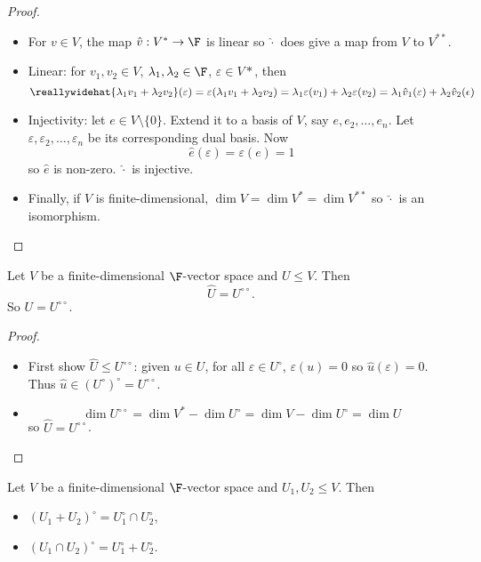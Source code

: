\documentclass[a4paper]{article}
\newcommand*{\ann}{\circ}
\theoremstyle{definition}
\begin{document}
\begin{proof}\leavevmode
  \begin{itemize}
  \item For \(v\in V\), the map \(\hat v: V^* \to \F\) is linear so \(\hat \cdot\) does give a map from \(V\) to \(V^{**}\).
  \item Linear: for \(v_1, v_2 \in V\), \(\lambda_1, \lambda_2 \in \F\), \(\varepsilon \in V*\), then
    \[
      \reallywidehat{\lambda_1v_1 + \lambda_2v_2}(\varepsilon) = \varepsilon(\lambda_1v_1 + \lambda_2v_2) = \lambda_1 \varepsilon(v_1) + \lambda_2 \varepsilon(v_2) = \lambda_1 \hat v_1(\varepsilon) + \lambda_2 \hat v_2(\epsilon)
    \]
  \item Injectivity: let \(e \in V\setminus\{0\}\). Extend it to a basis of \(V\), say \(e, e_2,\dots, e_n\). Let \(\varepsilon, \varepsilon_2,\dots, \varepsilon_n\) be its corresponding dual basis. Now
    \[
      \hat e(\varepsilon) = \varepsilon(e) = 1 
    \]
    so \(\hat e\) is non-zero. \(\hat \cdot\) is injective.
  \item Finally, if \(V\) is finite-dimensional, \(\dim V = \dim V^* = \dim V^{**}\) so \(\hat \cdot\) is an isomorphism.
  \end{itemize}
\end{proof}

\begin{lemma}
  Let \(V\) be a finite-dimensional \(\F\)-vector space and \(U \leq V\). Then
  \[
    \hat U = U^{\ann \ann}.
  \]
  So \(U = U^{\ann \ann}\).
\end{lemma}

\begin{proof}\leavevmode
  \begin{itemize}
  \item First show \(\hat U \leq U^{\ann \ann}\): given \(u \in U\), for all \(\varepsilon \in U^\ann\), \(\varepsilon(u) = 0\) so \(\hat u(\varepsilon) = 0\). Thus \(\hat u \in (U^\ann)^\ann = U^{\ann \ann}\).
  \item
    \[
      \dim U^{\ann \ann} = \dim V^* - \dim U^\ann = \dim V - \dim U^\ann = \dim U
    \] so \(\hat U = U^{\ann \ann}\).
  \end{itemize}
\end{proof}

\begin{lemma}
  Let \(V\) be a finite-dimensional \(\F\)-vector space and \(U_1, U_2 \leq V\). Then
  \begin{itemize}
  \item \((U_1 + U_2)^\ann = U_1^\ann \cap U_2^\ann\),
  \item \((U_1 \cap U_2)^\ann = U_1^\ann + U_2^\ann\).
  \end{itemize}
\end{lemma}
\end{document}
